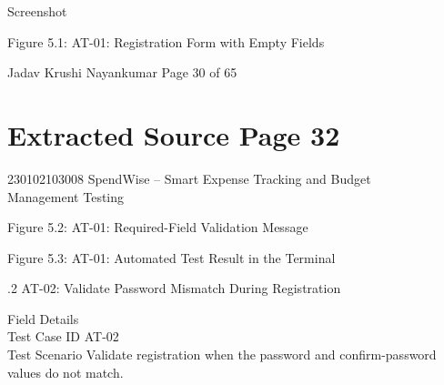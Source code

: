 \documentclass[12pt,a4paper]{report}
\begin{document}
\smallskip

\smallskip
Screenshot\\ 

\smallskip

\smallskip

\smallskip

\smallskip
Figure 5.1: AT-01: Registration Form with Empty Fields\\ 

\smallskip

\smallskip
Jadav Krushi Nayankumar                                                          Page 30 of 65\\ 

\clearpage
\section*{Extracted Source Page 32}
230102103008                        SpendWise – Smart Expense Tracking and Budget\\ 
Management Testing\\ 

\smallskip

\smallskip

\smallskip

\smallskip
Figure 5.2: AT-01: Required-Field Validation Message\\ 

\smallskip

\smallskip

\smallskip

\smallskip
Figure 5.3: AT-01: Automated Test Result in the Terminal\\ 

\smallskip

\smallskip

.2 AT-02: Validate Password Mismatch During Registration\\ 

\smallskip

\smallskip
Field                   Details\\ 
Test Case ID            AT-02\\ 
Test Scenario           Validate registration when the password and confirm-password\\ 
values do not match.\\ 

\smallskip

\smallskip

\smallskip
\end{document}

